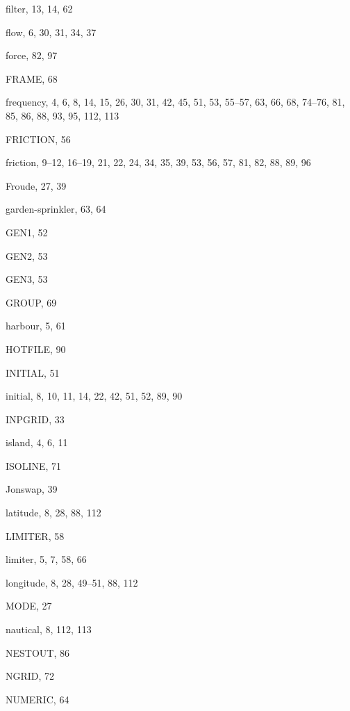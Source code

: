 \documentclass[12pt]{book}
\begin{document}
\begin{theindex}
  \indexspace

  \item filter, 13, 14, 62
  \item flow, 6, 30, 31, 34, 37
  \item force, 82, 97
  \item FRAME, 68
  \item frequency, 4, 6, 8, 14, 15, 26, 30, 31, 42, 45, 51, 53, 55--57,
		63, 66, 68, 74--76, 81, 85, 86, 88, 93, 95, 112, 113
  \item FRICTION, 56
  \item friction, 9--12, 16--19, 21, 22, 24, 34, 35, 39, 53, 56, 57,
		81, 82, 88, 89, 96
  \item Froude, 27, 39

  \indexspace

  \item garden-sprinkler, 63, 64
  \item GEN1, 52
  \item GEN2, 53
  \item GEN3, 53
  \item GROUP, 69

  \indexspace

  \item harbour, 5, 61
  \item HOTFILE, 90

  \indexspace

  \item INITIAL, 51
  \item initial, 8, 10, 11, 14, 22, 42, 51, 52, 89, 90
  \item INPGRID, 33
  \item island, 4, 6, 11
  \item ISOLINE, 71

  \indexspace

  \item Jonswap, 39

  \indexspace

  \item latitude, 8, 28, 88, 112
  \item LIMITER, 58
  \item limiter, 5, 7, 58, 66
  \item longitude, 8, 28, 49--51, 88, 112

  \indexspace

  \item MODE, 27

  \indexspace

  \item nautical, 8, 112, 113
  \item NESTOUT, 86
  \item NGRID, 72
  \item NUMERIC, 64


\end{theindex}
\end{document}
